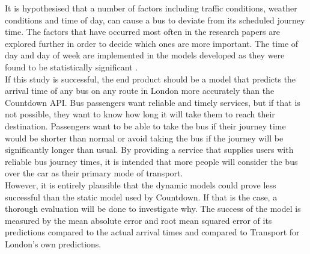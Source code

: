 It is hypothesised that a number of factors including traffic conditions, weather conditions and time of day, can cause a bus to deviate from its scheduled journey time. The factors that have occurred most often in the research papers are explored further in order to decide which ones are more important. The time of day and day of week are implemented in the models developed as they were found to be statistically significant \cite{apc-estimation}. \\

If this study is successful, the end product should be a model that predicts the arrival time of any bus on any route in London more accurately than the Countdown API. Bus passengers want reliable and timely services, but if that is not possible, they want to know how long it will take them to reach their destination. Passengers want to be able to take the bus if their journey time would be shorter than normal or avoid taking the bus if the journey will be significantly longer than usual. By providing a service that supplies users with reliable bus journey times, it is intended that more people will consider the bus over the car as their primary mode of transport. \\

However, it is entirely plausible that the dynamic models could prove less successful than the static model used by Countdown. If that is the case, a thorough evaluation will be done to investigate why. The success of the model is measured by the mean absolute error and root mean squared error of its predictions compared to the actual arrival times and compared to Transport for London's own predictions. 

\clearpage


